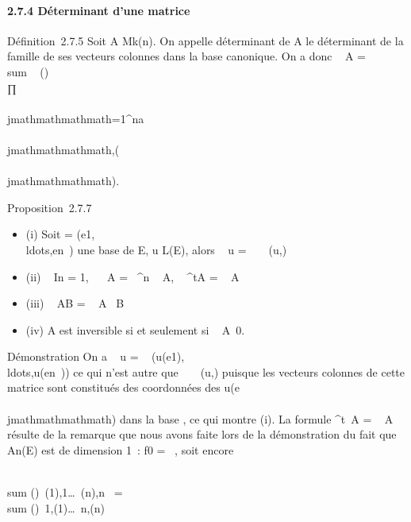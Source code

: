 \paragraph{2.7.4 Déterminant d'une matrice}

Définition~2.7.5 Soit A \in Mk(n). On appelle déterminant de A
le déterminant de la famille de ses vecteurs colonnes dans la base
canonique. On a donc
~ A
= \\sum ~
\sigma\inSn\epsilon(\sigma)\\∏
 \\\\jmathmathmathmath=1^na\\\\jmathmathmathmath,\sigma(\\\\jmathmathmathmath).

Proposition~2.7.7

\begin{itemize}
\itemsep1pt\parskip0pt
\item
  (i) Soit  =
  (e1,\\ldots,en~)
  une base de E, u \in L(E), alors
  ~ u
  = ~
  \mathrmMat~ (u,)
\item
  (ii) ~
  In = 1,
  ~ \lambda~A =
  \lambda~^n ~
  A, ~
  ^tA = ~
  A
\item
  (iii) ~ AB
  = ~
  A~ B
\item
  (iv) A est inversible si et seulement si
  ~
  A\neq~0.
\end{itemize}

Démonstration On a
~ u
= ~
(u(e1),\\ldots,u(en~))
ce qui n'est autre que
~
\mathrmMat~ (u,) puisque
les vecteurs colonnes de cette matrice sont constitués des coordonnées
des u(e\\\\jmathmathmathmath) dans la base , ce qui montre (i). La formule
 ^t~A
= ~ A résulte de
la remarque que nous avons faite lors de la démonstration du fait que
An(E) est de dimension 1~: f0
=  ~,
soit encore

\\sum
\sigma\inSn\epsilon(\sigma)\xi~\sigma(1),1\ldots\xi~\sigma(n),n~
= \\sum
\sigma\inSn\epsilon(\sigma)\xi~1,\sigma(1)\ldots\xi~n,\sigma(n)~

